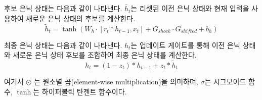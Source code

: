 \documentclass[11pt]{report}
\begin{document}
후보 은닉 상태는 다음과 같이 나타낸다. 
$\tilde{h_t}$는 리셋된 이전 은닉 상태와 현재 입력을 사용하여 새로운 은닉 상태의 후보를 계산한다. 
$$
\tilde{h}_t = \tanh(W_h \cdot [r_t \ast h_{t-1}, x_t] + G_{shock} \cdot G_{shifted} + b_h)
$$

최종 은닉 상태는 다음과 같이 나타낸다. 
$h_t$는 업데이트 게이트를 통해 이전 은닉 상태와 새로운 은닉 상태 후보를 조합하여 최종 은닉 상태를 계산한다. 
$$
h_t = (1 - z_t) \ast h_{t-1} + z_t \ast \tilde{h}_t
$$

여기서  $\odot$ 는 원소별 곱(element-wise multiplication)을 의미하며, $\sigma$는 시그모이드 함수,  $\tanh$는 하이퍼볼릭 탄젠트 함수이다.












\end{document}

